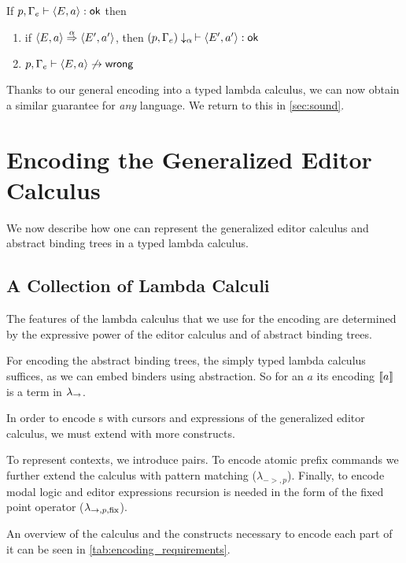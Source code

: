 \documentclass[sigplan,screen]{acmart}
\begin{document}
\begin{theorem}\label{thm:typesafe}
  If $p, \Gamma_e \vdash \langle E,a \rangle : \textsf{ok}$ then
  \begin{enumerate}
  \item if $\langle E,a \rangle \stackrel{\alpha}{\Rightarrow} \langle E',a' \rangle$, then
    $(p,\Gamma_e)\downarrow_\alpha \, \vdash \langle E',a' \rangle : \textsf{ok}$

  \item $p, \Gamma_e \vdash \langle E,a \rangle \not\to \textsf{wrong}$
  \end{enumerate}
\end{theorem}

Thanks to our general encoding into a typed lambda calculus, we can
now obtain a similar guarantee for \emph{any} language. We return to
this in \cref{sec:sound}.

\section{Encoding the Generalized Editor Calculus} \label{sec:encoding}

We now describe how one can represent the generalized editor calculus
and abstract binding trees in a typed lambda calculus.

\subsection{A Collection of Lambda Calculi}

The features of the lambda calculus that we use for the encoding are
determined by the expressive power of the editor calculus and of
abstract binding trees.

For encoding the abstract binding trees, the simply typed lambda
calculus suffices, as we can embed binders using abstraction. So for
an \abt $a$ its encoding $\llbracket a \rrbracket$ is a term in $\lambda_{->}$.

In order to encode {\abt}s with cursors and expressions of the
generalized editor calculus, we must extend \stlc with more constructs.

To represent contexts, we introduce pairs. To encode atomic prefix
commands we further extend the calculus with pattern matching
($\lambda_{->,p}$). Finally, to encode modal logic and editor
expressions recursion is needed in the form of the fixed point
operator ($\lambda_{->,p,\text{fix}}$).

An overview of the calculus and the constructs necessary to encode
each part of it can be seen in \cref{tab:encoding_requirements}.
\end{document}
